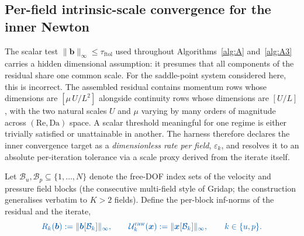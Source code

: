 \documentclass{article}
\newcommand{\textftol}{\tau_{\mathrm{ftol}}}
\newcommand{\extline}[1]{{\color{extcolor}#1}}
\begin{document}
\subsection{Per-field intrinsic-scale convergence for the inner Newton}
\label{sec:harness-perfield}

\extline{The scalar test $\|\boldsymbol{b}\|_\infty \le \textftol$ used
throughout Algorithms~\ref{alg:A} and~\ref{alg:A3} carries a hidden
dimensional assumption: it presumes that all components of the
residual share one common scale. For the saddle-point system
considered here, this is incorrect. The assembled residual contains
momentum rows whose dimensions are $[\mu\, U / L^{2}]$ alongside
continuity rows whose dimensions are $[U/L]$, with the two natural
scales $U$ and $\mu$ varying by many orders of magnitude across
$(\mathrm{Re}, \mathrm{Da})$ space. A scalar threshold meaningful for
one regime is either trivially satisfied or unattainable in another.
The harness therefore declares the inner convergence target as a
\emph{dimensionless rate per field}, $\varepsilon_{k}$, and resolves
it to an absolute per-iteration tolerance via a scale proxy derived
from the iterate itself.}

\extline{Let $\mathcal{B}_{u}, \mathcal{B}_{p} \subseteq \{1,\dots,N\}$
denote the free-DOF index sets of the velocity and pressure field
blocks (the consecutive multi-field style of Gridap; the construction
generalises verbatim to $K > 2$ fields). Define the per-block
inf-norms of the residual and the iterate,}
\begin{equation}
    \label{eq:per-field-norms}
    \textcolor{extcolor}{
    R_{k}(\boldsymbol{b}) := \|\boldsymbol{b}[\mathcal{B}_{k}]\|_{\infty},
    \qquad
    \mathcal{U}_{k}^{\mathrm{raw}}(\boldsymbol{x}) := \|\boldsymbol{x}[\mathcal{B}_{k}]\|_{\infty},
    \qquad k \in \{u, p\}.}
\end{equation}
\end{document}
